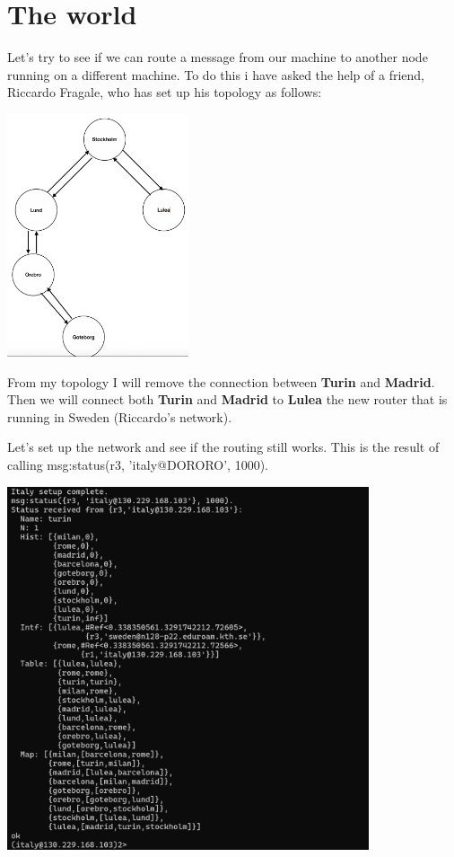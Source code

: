 \documentclass[a4paper, 11pt]{article}
\begin{document}
\section{The world}

Let's try to see if we can route a message from our machine to another node running on a different machine. To do this i have asked the help of a friend, Riccardo Fragale, who has set up his topology as follows:

\begin{center}
\includegraphics[width=0.4\textwidth]{screenshots/riccardos_topology.png}
\end{center}

From my topology I will remove the connection between \textbf{Turin} and \textbf{Madrid}. Then we will connect both \textbf{Turin} and \textbf{Madrid} to \textbf{Lulea} the new router that is running in Sweden (Riccardo's network).

Let's set up the network and see if the routing still works. This is the result of calling msg:status({r3, 'italy@DORORO'}, 1000).

\begin{center}
\includegraphics[width=0.8\textwidth]{screenshots/initial_status.png}
\end{center}
\end{document}
